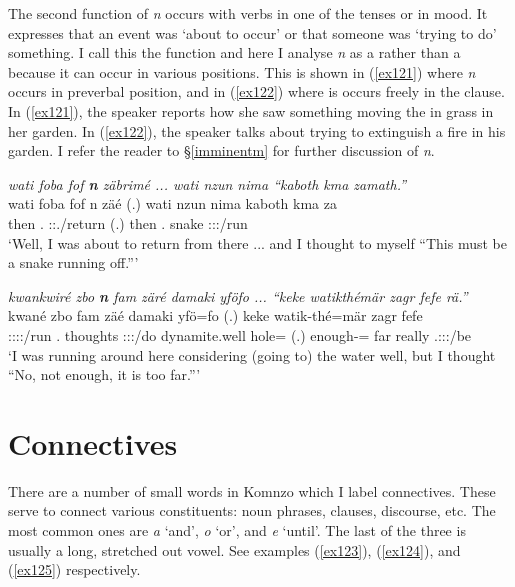 The second function of \emph{n} occurs with verbs in one of the  tenses or in  mood. It expresses that an event was `about to occur' or that someone was `trying to do' something. I call this the  function and here I analyse \emph{n} as a  rather than a  because it can occur in various positions. This is shown in (\ref{ex121}) where \emph{n} occurs in preverbal position, and in (\ref{ex122}) where is occurs freely in the clause. In (\ref{ex121}), the speaker reports how she saw something moving the in grass in her garden. In (\ref{ex122}), the speaker talks about trying to extinguish a fire in his garden. I refer the reader to \S{}\ref{imminentm} for further discussion of \emph{n}.

\begin{exe}
	\ex \emph{wati foba fof \textbf{n} zäbrimé ... wati nzun nima ``kaboth kma zamath.''}\\
	\gll wati foba fof n zäé (.) wati nzun nima kaboth kma za\\
	then \Dist{}.\Abl{} \Emph{} \Imn{} \Fsg:\Sbj:\Rpst.\Pfv/return (.) then \Fsg{}.\Dat{} \Quot{} snake \Pot{} \Stsg:\Sbj:\Rpst:\Pfv/run\\
	\trans `Well, I was about to return from there ... and I thought to myself ``This must be a snake running off.''' 
	\label{ex121}
\end{exe}
\begin{exe}
	\ex \emph{kwankwiré zbo \textbf{n} fam zäré damaki yföfo ... ``keke watikthémär zagr fefe rä.''}\\
	\gll kwané zbo  fam zäé damaki yfö=fo (.) keke watik-thé=mär zagr fefe \\
	\Fsg:\Sbj:\Nonpast:\Ipfv:\Venit/run \Prox{}.\All{} \Imn{} thoughts \Fsg:\Sbj:\Rpst:\Pfv/do dynamite.well hole=\All{} (.) \Neg{} enough-\Adlzr{}=\Priv{} far really \Tsg.\F:\Sbj:\Nonpast:\Ipfv/be\\
	\trans `I was running around here considering (going to) the water well, but I thought ``No, not enough, it is too far.''' 
	\label{ex122}
\end{exe}

\section{Connectives} \label{connectives}

There are a number of small words in Komnzo which I label connectives. These serve to connect various constituents: noun phrases, clauses, discourse, etc. The most common ones are \emph{a} `and', \emph{o} `or', and \emph{e} `until'. The last of the three is usually a long, stretched out vowel. See examples (\ref{ex123}), (\ref{ex124}), and (\ref{ex125}) respectively.

